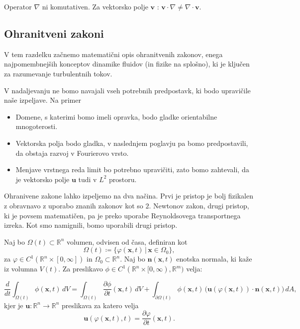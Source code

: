 \documentclass[mat2, tisk]{fmfdelo}
\newcommand{\R}{\mathbb R}
\newcommand{\bd}{\textbf}
\begin{document}
\begin{opomba}
Operator $\nabla$ ni komutativen. Za vektorsko polje $\bd{v}$ : $\bd{v} \cdot \nabla \neq \nabla \cdot \bd{v}$.
\end{opomba}


\subsection{Ohranitveni zakoni}

V tem razdelku začnemo matematični opis ohranitvenih zakonov, enega najpomembnejših konceptov dinamike fluidov (in fizike na splošno), 
ki je ključen za razumevanje turbulentnih tokov. 

\begin{opomba}
V nadaljevanju ne bomo navajali vseh potrebnih predpostavk, ki bodo upravičile naše izpeljave. Na primer 
\begin{itemize}
  \item Domene, s katerimi bomo imeli opravka, bodo gladke orientabilne mnogoterosti.
  \item Vektorska polja bodo gladka, v naslednjem poglavju pa bomo predpostavili, da 
  obstaja razvoj v Fourierovo vrsto.
  \item Menjave vrstnega reda limit bo potrebno upravičiti, zato bomo zahtevali, da je 
  vektorsko polje $\bd{u}$ tudi v $L^2$ prostoru.
\end{itemize}
\end{opomba}

Ohranivene zakone lahko izpeljemo na dva načina. Prvi je pristop je bolj fizikalen 
z obravnavo z uporabo znanih zakonov kot so $2$. Newtonov zakon, drugi pristop, ki je povsem matematičen,
pa je preko uporabe Reynoldsovega transportnega izreka. Kot smo namignili, bomo uporabili drugi 
pristop. 

\begin{izrek}

Naj bo $\Omega(t) \subset \mathbb{R}^n$ volumen, odvisen od časa, 
definiran kot 
$$
\Omega(t) \coloneqq \{\varphi(\bd{x}, t) \,|\, \bd{x} \in \Omega_0\},
$$
za $\varphi \in C^1(\R^n \times [0, \infty])$ in $\Omega_0 \subset \R^n$.
Naj bo $\mathbf{n}(\mathbf{x},t)$ enotska normala, ki kaže iz volumna $V(t)$.  
Za preslikavo $\phi \in C^1(\R^n \times [0, \infty), \R^m)$ velja:

\begin{equation}
\frac{d}{dt} \int_{\Omega(t)} \phi(\mathbf{x},t)\, dV
= \int_{\Omega(t)} \frac{\partial \phi}{\partial t}(\mathbf{x},t)\, dV
+ \int_{\partial \Omega(t)} \phi(\mathbf{x},t)\, \big(\bd{u}(\varphi(\bd{x}, t))\cdot \mathbf{n}(\mathbf{x},t)\big)\, dA,
\end{equation}
kjer je $\bd{u}:\R^n \rightarrow \R^n$ preslikava za katero velja 
\begin{equation}
\bd{u}(\varphi(\bd{x}, t), t) = \frac{\partial \varphi}{\partial t}(\bd{x}, t).
\end{equation}
\end{izrek}
\end{document}
